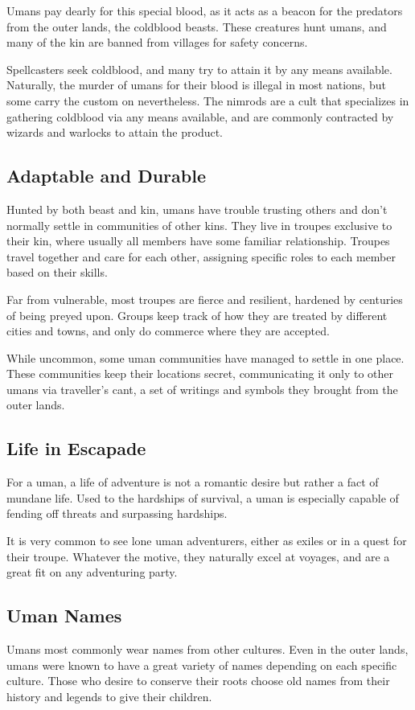 Umans pay dearly for this special blood, as it acts as a beacon for the predators from the outer lands, the coldblood beasts.
These creatures hunt umans, and many of the kin are banned from villages for safety concerns.

Spellcasters seek coldblood, and many try to attain it by any means available.
Naturally, the murder of umans for their blood is illegal in most nations, but some carry the custom on nevertheless.
The nimrods are a cult that specializes in gathering coldblood via any means available, and are commonly contracted by wizards and warlocks to attain the product.

\subsection*{Adaptable and Durable}
Hunted by both beast and kin, umans have trouble trusting others and don't normally settle in communities of other kins.
They live in troupes exclusive to their kin, where usually all members have some familiar relationship.
Troupes travel together and care for each other, assigning specific roles to each member based on their skills.

Far from vulnerable, most troupes are fierce and resilient, hardened by centuries of being preyed upon.
Groups keep track of how they are treated by different cities and towns, and only do commerce where they are accepted.

While uncommon, some uman communities have managed to settle in one place.
These communities keep their locations secret, communicating it only to other umans via traveller's cant, a set of writings and symbols they brought from the outer lands.

\subsection*{Life in Escapade}
For a uman, a life of adventure is not a romantic desire but rather a fact of mundane life.
Used to the hardships of survival, a uman is especially capable of fending off threats and surpassing hardships.

It is very common to see lone uman adventurers, either as exiles or in a quest for their troupe.
Whatever the motive, they naturally excel at voyages, and are a great fit on any adventuring party.

\subsection*{Uman Names}
Umans most commonly wear names from other cultures.
Even in the outer lands, umans were known to have a great variety of names depending on each specific culture.
Those who desire to conserve their roots choose old names from their history and legends to give their children.

